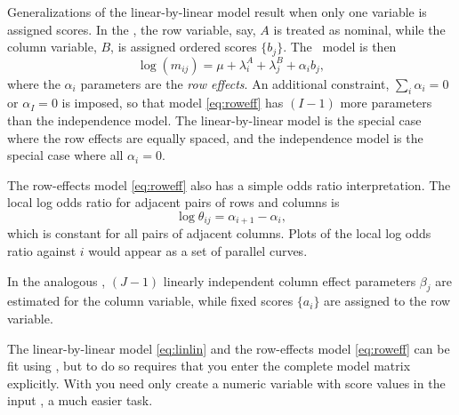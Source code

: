 Generalizations of the linear-by-linear model result when only one
variable is assigned scores.
In the ,
the row variable, say, $A$ is treated as nominal, while
the column variable, $B$, is assigned ordered scores $\{b_j\}$.
The \loglin\ model is then
\begin{equation}\label{eq:roweff}
 \log ( m_{ij} ) = \mu  +  \lambda_i^A
  +  \lambda_j^B  +  \alpha_i b_j
 \comma
\end{equation}
where the $\alpha_i$ parameters are the \emph{row effects}.
An additional constraint,
$\sum_i \alpha_i =0$ or $\alpha_I =0$
 is imposed, so that model \eqref{eq:roweff}
has $(I-1)$ more parameters than the independence model.
The linear-by-linear model is the special case where the row effects
are equally spaced, and the independence model is the special case
where all $\alpha_i = 0$.

The row-effects model \eqref{eq:roweff} also has a simple odds ratio interpretation.
The local log odds ratio for adjacent pairs of rows and columns is
\begin{equation*}
\log \theta_{ij} =
  \alpha_{i+1} - \alpha_i
  \comma
\end{equation*}
which is constant for all pairs of adjacent columns.  Plots of the
local log odds ratio against $i$ would appear as a set of parallel
curves.

In the analogous , $(J-1)$ linearly independent
column effect
parameters $\beta_j$ are estimated for the column variable, while fixed
scores $\{a_i\}$ are assigned to the row variable.

The linear-by-linear model \eqref{eq:linlin} and the row-effects model
\eqref{eq:roweff} can be fit using ,
but to do so requires that you enter the complete model matrix explicitly.
With  you need only create a numeric variable with score
values in the input \Dset, a much easier task.


